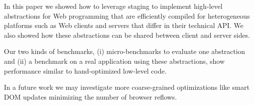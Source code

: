 \documentclass{llncs}
\begin{document}
In this paper we showed how to leverage staging to implement high-level abstractions for Web
programming that are efficiently compiled for heterogeneous platforms such as Web clients and
servers that differ in their technical API. We also showed how these abstractions can be shared
between client and server sides. 

Our two kinds of benchmarks, (i) micro-benchmarks to evaluate one abstraction and (ii) a benchmark
on a real application using these abstractions, show performance similar to hand-optimized
low-level code.

In a future work we may investigate more coarse-grained optimizations like smart DOM updates
minimizing the number of browser reflows.

%
%
%


%

\end{document}
